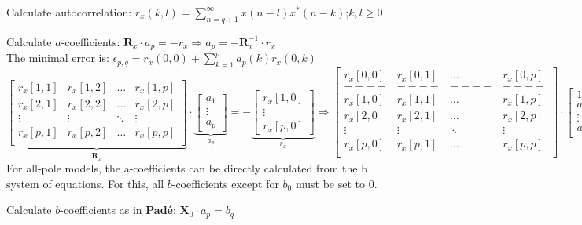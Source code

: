 \begin{aufzaehlung}
	\item Calculate autocorrelation: $ r_x(k,l) = \sum\limits_{n=q+1}^\infty x(n-l)x^*(n-k)$;\qquad $k,l\geq 0$
	\item Calculate $a$-coefficients: $\bm R_x \cdot a_p = -r_x \Longrightarrow a_p = - \bm R_x^{-1} \cdot r_x$
  		\small\\
		The minimal error is: $\epsilon_{p,q} = r_x(0,0) + \sum\limits_{k=1}^p a_p(k) r_x(0,k)$
			$$
		\underbrace{\begin{bmatrix}
    		r_x[1,1] & r_x[1,2] & \hdots & r_x[1,p] \\
    		r_x[2,1] & r_x[2,2] & \hdots & r_x[2,p] \\
    		\vdots & \vdots & \ddots & \vdots \\
    		r_x[p,1] & r_x[p,2] & \hdots & r_x[p,p] \\
		\end{bmatrix}  }_{\bm R_x} \cdot
		\underbrace{\begin{bmatrix}
    		a_1 \\
    		\vdots \\
    		a_p
		\end{bmatrix}  }_{a_p}= -\underbrace{\begin{bmatrix}
    		r_x[1,0] \\
    		\vdots \\
    		r_x[p,0]
		\end{bmatrix}  }_{r_x}
		\Longrightarrow
		\begin{bmatrix}
    		r_x[0,0] & r_x[0,1] & \hdots & r_x[0,p] \\
    		----&----&----&----\\
    		r_x[1,0] & r_x[1,1] & \hdots & r_x[1,p] \\
    		r_x[2,0] & r_x[2,1] & \hdots & r_x[2,p] \\
    		\vdots & \vdots & \ddots & \vdots \\
    		r_x[p,0] & r_x[p,1] & \hdots & r_x[p,p] \\
		\end{bmatrix} \cdot
		\begin{bmatrix}
    		1 \\
    		a_1 \\
    		\vdots \\
    		a_p
		\end{bmatrix} = \begin{bmatrix}
    		\epsilon_{p,q} \\
    		---\\
    		0 \\
    		\vdots \\
    		0
		\end{bmatrix} $$
		For all-pole models, the a-coefficients can be directly calculated from the b system of equations.
		For this, all $b$-coefficients except for $b_0$ must be set to 0.
	\item Calculate $b$-coefficients as in \textbf{Padé}: $\bm X_0 \cdot a_p = b_q$
		\normalsize
\end{aufzaehlung}

